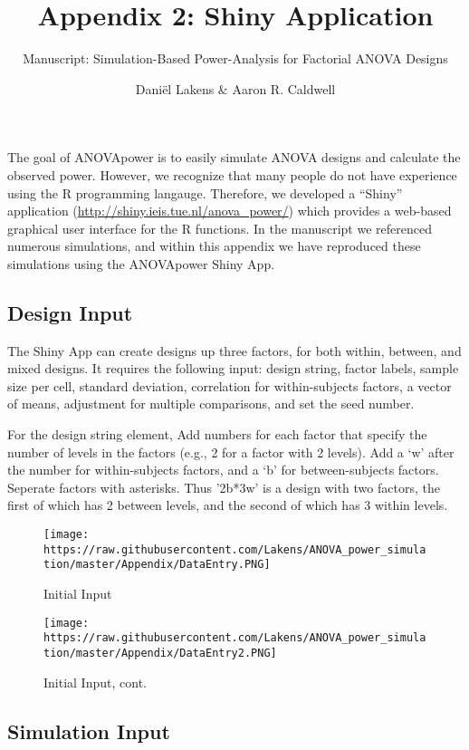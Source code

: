 \documentclass[]{article}
\title{Appendix 2: Shiny Application}
\subtitle{Manuscript: Simulation-Based Power-Analysis for Factorial ANOVA Designs}
\author{Daniël Lakens \& Aaron R. Caldwell}
\date{}
\begin{document}
\maketitle

The goal of ANOVApower is to easily simulate ANOVA designs and calculate
the observed power. However, we recognize that many people do not have
experience using the R programming langauge. Therefore, we developed a
``Shiny'' application (\url{http://shiny.ieis.tue.nl/anova_power/})
which provides a web-based graphical user interface for the R functions.
In the manuscript we referenced numerous simulations, and within this
appendix we have reproduced these simulations using the ANOVApower Shiny
App.

\subsection{Design Input}\label{design-input}

The Shiny App can create designs up three factors, for both within,
between, and mixed designs. It requires the following input: design
string, factor labels, sample size per cell, standard deviation,
correlation for within-subjects factors, a vector of means, adjustment
for multiple comparisons, and set the seed number.

For the design string element, Add numbers for each factor that specify
the number of levels in the factors (e.g., 2 for a factor with 2
levels). Add a `w' after the number for within-subjects factors, and a
`b' for between-subjects factors. Seperate factors with asterisks. Thus
'2b*3w' is a design with two factors, the first of which has 2 between
levels, and the second of which has 3 within levels.

\begin{figure}
\centering
\texttt{[image: https://raw.githubusercontent.com/Lakens/ANOVA\_power\_simulation/master/Appendix/DataEntry.PNG]}
\caption{Initial Input}
\end{figure}

\begin{figure}
\centering
\texttt{[image: https://raw.githubusercontent.com/Lakens/ANOVA\_power\_simulation/master/Appendix/DataEntry2.PNG]}
\caption{Initial Input, cont.}
\end{figure}

\subsection{Simulation Input}\label{simulation-input}
\end{document}
